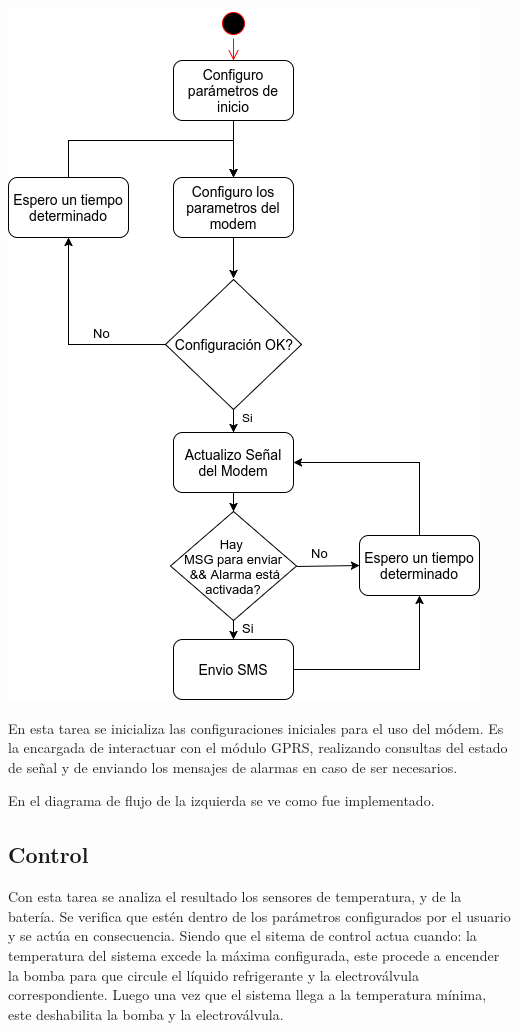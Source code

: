 \begin{minipage}{0.4\textwidth}
    \includegraphics[width=\textwidth]{./Figures/modem_task.png}
\end{minipage}\hspace{5mm} %
\begin{minipage}{0.6\textwidth}
  En esta tarea se inicializa las configuraciones iniciales para el uso del módem. Es la encargada de interactuar con el módulo GPRS, realizando consultas del estado de señal y de enviando los mensajes de alarmas en caso de ser necesarios.

 En el diagrama de flujo de la izquierda se ve como fue implementado.
\end{minipage}

\subsection*{Control}
Con esta tarea se analiza el resultado los sensores de temperatura, y de la batería. Se verifica que estén dentro de los parámetros configurados por el usuario y se actúa en consecuencia. Siendo que el sitema de control actua cuando: la temperatura del sistema excede la máxima configurada, este procede a encender la bomba para que circule el líquido refrigerante y la electroválvula correspondiente. Luego una vez que el sistema llega a la temperatura mínima, este deshabilita la bomba y la electroválvula.

